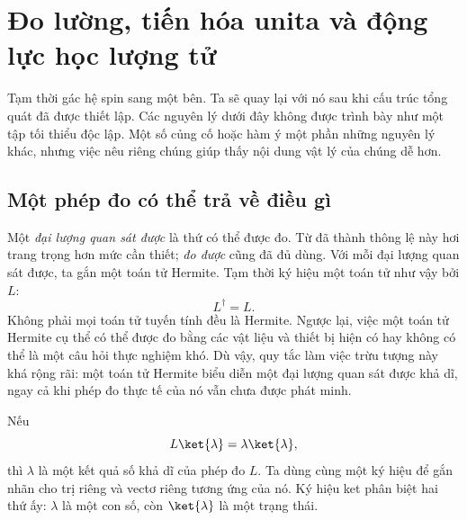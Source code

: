 \chapter{Đo lường, tiến hóa unita và động lực học lượng tử}


Tạm thời gác hệ spin sang một bên. Ta sẽ quay lại với nó sau khi cấu trúc tổng quát đã được thiết lập. Các nguyên lý dưới đây không được trình bày như một tập tối thiểu độc lập. Một số củng cố hoặc hàm ý một phần những nguyên lý khác, nhưng việc nêu riêng chúng giúp thấy nội dung vật lý của chúng dễ hơn.

\section{Một phép đo có thể trả về điều gì}

Một \emph{đại lượng quan sát được} là thứ có thể được đo. Từ đã thành thông lệ này hơi trang trọng hơn mức cần thiết; \emph{đo được} cũng đã đủ dùng. Với mỗi đại lượng quan sát được, ta gắn một toán tử Hermite. Tạm thời ký hiệu một toán tử như vậy bởi \(L\):
\begin{equation}
L^\dagger=L.
\end{equation}
Không phải mọi toán tử tuyến tính đều là Hermite. Ngược lại, việc một toán tử Hermite cụ thể có thể được đo bằng các vật liệu và thiết bị hiện có hay không có thể là một câu hỏi thực nghiệm khó. Dù vậy, quy tắc làm việc trừu tượng này khá rộng rãi: một toán tử Hermite biểu diễn một đại lượng quan sát được khả dĩ, ngay cả khi phép đo thực tế của nó vẫn chưa được phát minh.

Nếu
\begin{equation}
L\ket{\lambda}=\lambda\ket{\lambda},
\end{equation}
thì \(\lambda\) là một kết quả số khả dĩ của phép đo \(L\). Ta dùng cùng một ký hiệu để gắn nhãn cho trị riêng và vectơ riêng tương ứng của nó. Ký hiệu ket phân biệt hai thứ ấy: \(\lambda\) là một con số, còn \(\ket{\lambda}\) là một trạng thái.

